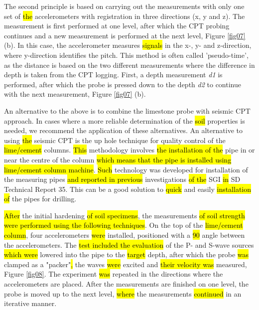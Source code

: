 \documentclass[final,3p,times,onecolumn,authoryear]{elsarticle}
\begin{document}
The second principle is based on carrying out the measurements with only one set of \hl{the }accelerometers with registration in three directions (x, y and z). The measurement is first performed at one level, after which the CPT probing continues and a new measurement is performed at the next level, Figure \ref{fig07} (b). In this case, the accelerometer measures \hl{signals }in the x-, y- and z-direction, where y-direction identifies the pitch. This method is often called 'pseudo-time', as the distance is based on the two different measurements where the difference in depth is taken from the CPT logging. First, a depth measurement \emph{d1} is performed, after which the probe is pressed down to the depth \emph{d2} to continue with the next measurement, Figure \ref{fig07} (b).

An alternative to the above is to combine the limestone probe with seismic CPT approach. In cases where a more reliable determination of the \hl{soil }properties is needed, we recommend the application of these alternatives. An alternative to using \hl{the }seismic CPT is the up hole technique for quality control of the \hl{lime/cement} columns. \hl{This} methodology involves \hl{the installation of the }pipe in or near the centre of the column\hl{ which means that the pipe is installed using lime/cement column machine}. \hl{Such} technology was developed for installation of the measuring pipes \hl{and reported in previous }investigations \hl{of the }SGI \hl{in }SD Technical Report 35. This can be a good solution to \hl{quick} and easily \hl{installation of} the pipes for drilling. 

\hl{After} the initial hardening \hl{of soil specimens}, the measurements \hl{of soil strength were performed using the following techniques}. On the top of the \hl{lime/cement column}, four accelerometers \hl{were} installed, positioned with a \hl{90\textdegree{} }angle between the accelerometers. The\hl{ test included the evaluation} of the P- and S-wave sources \hl{which were} lowered into the pipe to the \hl{target} depth, after which the probe \hl{was} clamped as a "packer"\hl{, }the waves \hl{were} excited and \hl{their velocity was} measured, Figure \ref{fig08}. The experiment \hl{was} repeated in the directions where the accelerometers are placed. After the measurements are finished on one level, the probe is moved up to the next level, \hl{where} the measurements \hl{continued} in an iterative manner.
\end{document}
